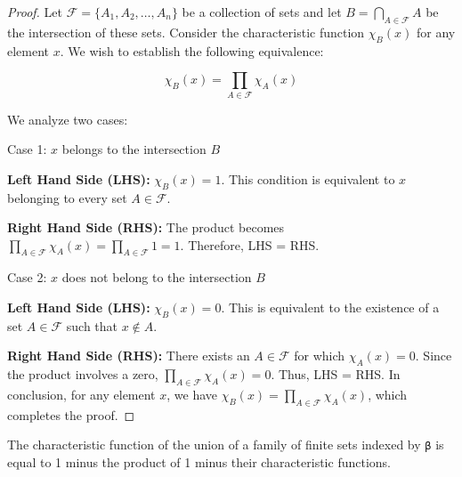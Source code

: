 \begin{proof}
  \leanok
  Let $\mathcal{F} = \{A_1, A_2, \ldots, A_n\}$ be a collection of sets and let $B = \bigcap_{A \in \mathcal{F}} A$ be the intersection of these sets. Consider the characteristic function $\chi_B(x)$ for any element $x$. We wish to establish the following equivalence:

  \begin{equation*}
  \chi_B(x) = \prod_{A \in \mathcal{F}} \chi_A(x)
  \end{equation*}

  We analyze two cases:

  Case 1: $x$ belongs to the intersection $B$

  \textbf{Left Hand Side (LHS):} $\chi_B(x) = 1$. This condition is equivalent to $x$ belonging to every set $A \in \mathcal{F}$.

  \textbf{Right Hand Side (RHS):} The product becomes $\prod_{A \in \mathcal{F}} \chi_A(x) = \prod_{A \in \mathcal{F}} 1 = 1$. Therefore, LHS = RHS.

  Case 2: $x$ does not belong to the intersection $B$

  \textbf{Left Hand Side (LHS):} $\chi_B(x) = 0$. This is equivalent to the existence of a set $A \in \mathcal{F}$ such that $x \not\in A$.

  \textbf{Right Hand Side (RHS):} There exists an $A \in \mathcal{F}$ for which $\chi_A(x) = 0$. Since the product involves a zero, $\prod_{A \in \mathcal{F}} \chi_A(x) = 0$. Thus, LHS = RHS.
  In conclusion, for any element $x$, we have $\chi_B(x) = \prod_{A \in \mathcal{F}} \chi_A(x)$, which completes the proof.

\end{proof}

\begin{lemma}\label{char_fun_FinUnion}
  \leanok
  The characteristic function of the union of a family of finite sets indexed by \verb|β| is equal to 1 minus the product of 1 minus their characteristic functions.
\end{lemma}

